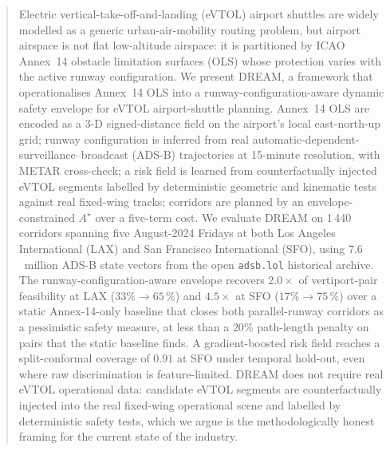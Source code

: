 \begin{abstract}
Electric vertical-take-off-and-landing (eVTOL) airport shuttles are widely
modelled as a generic urban-air-mobility routing problem, but airport airspace
is not flat low-altitude airspace: it is partitioned by ICAO Annex~14 obstacle
limitation surfaces (OLS) whose protection varies with the active runway
configuration. We present DREAM, a framework that operationalises Annex~14 OLS
into a runway-configuration-aware dynamic safety envelope for eVTOL
airport-shuttle planning. Annex~14 OLS are encoded as a 3-D signed-distance
field on the airport's local east-north-up grid; runway configuration is
inferred from real automatic-dependent-surveillance--broadcast (ADS-B)
trajectories at 15-minute resolution, with METAR cross-check; a risk field is
learned from counterfactually injected eVTOL segments labelled by deterministic
geometric and kinematic tests against real fixed-wing tracks; corridors are
planned by an envelope-constrained $A^\star$ over a five-term cost. We evaluate
DREAM on 1\,440 corridors spanning five August-2024 Fridays at both Los
Angeles International (LAX) and San Francisco International (SFO), using
$7.6$~million ADS-B state vectors from the open \texttt{adsb.lol} historical
archive. The runway-configuration-aware envelope recovers $2.0\times$ of
vertiport-pair feasibility at LAX ($33 \% \to 65\,\%$) and $4.5\times$ at SFO
($17 \% \to 75\,\%$) over a static Annex-14-only baseline that closes both
parallel-runway corridors as a pessimistic safety measure, at less than a
$20 \%$ path-length penalty on pairs that the static baseline finds. A
gradient-boosted risk field reaches a split-conformal coverage of $0.91$ at SFO
under temporal hold-out, even where raw discrimination is feature-limited.
DREAM does not require real eVTOL operational data: candidate eVTOL segments
are counterfactually injected into the real fixed-wing operational scene and
labelled by deterministic safety tests, which we argue is the methodologically
honest framing for the current state of the industry.
\end{abstract}
